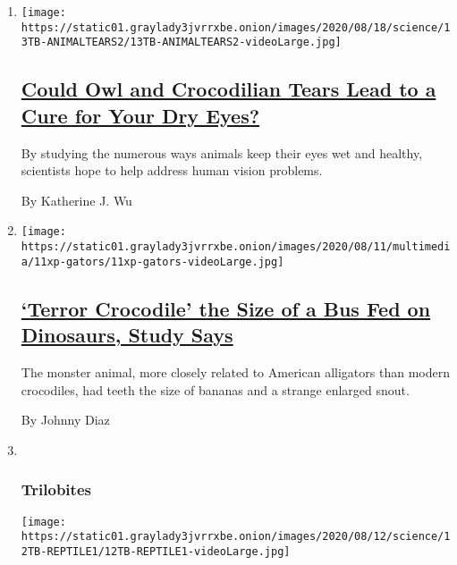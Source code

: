\begin{enumerate}
\def\labelenumi{\arabic{enumi}.}
\item
  \texttt{[image: https://static01.graylady3jvrrxbe.onion/images/2020/08/18/science/13TB-ANIMALTEARS2/13TB-ANIMALTEARS2-videoLarge.jpg]}

  \hypertarget{could-owl-and-crocodilian-tears-lead-to-a-cure-for-your-dry-eyes}{%
  \subsection{\texorpdfstring{\href{/2020/08/13/science/animal-tears.html}{Could
  Owl and Crocodilian Tears Lead to a Cure for Your Dry
  Eyes?}}{Could Owl and Crocodilian Tears Lead to a Cure for Your Dry Eyes?}}\label{could-owl-and-crocodilian-tears-lead-to-a-cure-for-your-dry-eyes}}

  By studying the numerous ways animals keep their eyes wet and healthy,
  scientists hope to help address human vision problems.

  By Katherine J. Wu
\item
  \texttt{[image: https://static01.graylady3jvrrxbe.onion/images/2020/08/11/multimedia/11xp-gators/11xp-gators-videoLarge.jpg]}

  \hypertarget{terror-crocodile-the-size-of-a-bus-fed-on-dinosaurs-study-says}{%
  \subsection{\texorpdfstring{\href{/2020/08/13/science/large-crocodile-deinosuchus.html}{`Terror
  Crocodile' the Size of a Bus Fed on Dinosaurs, Study
  Says}}{`Terror Crocodile' the Size of a Bus Fed on Dinosaurs, Study Says}}\label{terror-crocodile-the-size-of-a-bus-fed-on-dinosaurs-study-says}}

  The monster animal, more closely related to American alligators than
  modern crocodiles, had teeth the size of bananas and a strange
  enlarged snout.

  By Johnny Diaz
\item ~
  \hypertarget{trilobites-2}{%
  \subsubsection{Trilobites}\label{trilobites-2}}

  \texttt{[image: https://static01.graylady3jvrrxbe.onion/images/2020/08/12/science/12TB-REPTILE1/12TB-REPTILE1-videoLarge.jpg]}

  \hypertarget{making-sense-of-one-of-the-most-baffling-animals-that-ever-lived}{%
}
\end{enumerate}

